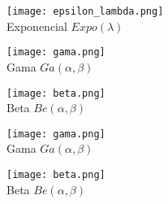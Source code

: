 

\begin{figure}[H]\centering
\begin{subfigure}[t]{.3\textwidth}\texttt{[image: epsilon\_lambda.png]}\centering\\Exponencial $Expo(\lambda)$\end{subfigure}\quad
\begin{subfigure}[t]{.3\textwidth}\texttt{[image: gama.png]}\centering\\Gama $Ga(\alpha,\beta)$\end{subfigure}\quad
\begin{subfigure}[t]{.3\textwidth}\texttt{[image: beta.png]}\centering\\Beta $Be(\alpha,\beta)$\end{subfigure}
\end{figure}

\begin{figure}[H]\centering
\begin{subfigure}[t]{.475\textwidth}\texttt{[image: gama.png]}\centering\\Gama $Ga(\alpha,\beta)$
\end{subfigure}\quad
\begin{subfigure}[t]{.475\textwidth}\texttt{[image: beta.png]}\centering\\Beta $Be(\alpha,\beta)$
\end{subfigure}
\end{figure}

